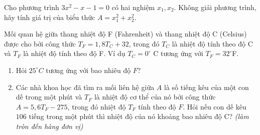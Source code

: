\begin{ex}%
	Cho phương trình $ 3x^2 -x -1 = 0 $ có hai nghiệm $ x_1,x_2 $. Không giải phương trình, hãy tính giá trị của biểu thức $ A = x_1^2 + x_2^2 $.
	
\end{ex}
\begin{ex}%
	Mối quan hệ giữa thang nhiệt độ F  (Fahrenheit) và thang nhiệt độ C (Celsius) được cho bởi công thức $ T_F = 1,8T_C +32 $, trong đó $ T_C $ là nhiệt độ tính theo độ  C  và $ T_F $ là nhiệt độ tính theo độ F. Ví dụ $ T_C = 0^\circ$ C  tương ứng với $ T_F = 32^\circ $F.
	\begin{enumerate}
		\item Hỏi $ 25^\circ C $ tương ứng với bao nhiêu độ $ F $?
		\item Các nhà khoa học đã tìm ra mối liên hệ giữa $ A $ là số tiếng kêu của  một con dế trong một phút và $ T_F $ là nhiệt độ cơ thể của nó bởi công thức $ A = 5,6T_F - 275 $, trong đó nhiệt độ $ T_F $ tính theo độ $ F $. Hỏi nếu con dế kêu $106$ tiếng trong một phút thì nhiệt độ của nó khoảng bao nhiêu độ C? \textit{(làm tròn đến hàng đơn vị)}
	\end{enumerate}
	
\end{ex}
